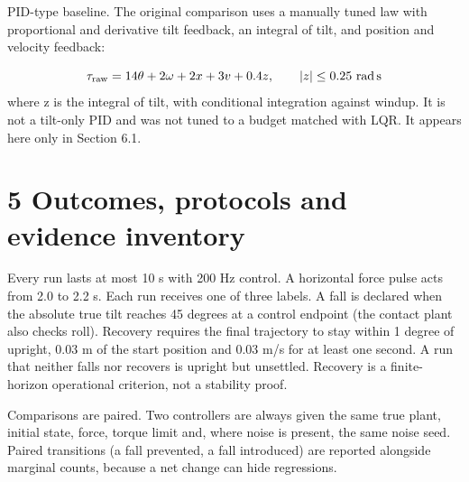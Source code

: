 \documentclass[11pt,a4paper]{article}
\begin{document}
PID-type baseline. The original comparison uses a manually tuned law with proportional and derivative tilt feedback, an integral of tilt, and position and velocity feedback:

\begin{equation}\tau_{\rm raw}=14\theta+2\omega+2x+3v+0.4z,\qquad |z|\leq 0.25\ {\rm rad\,s}\end{equation}
where z is the integral of tilt, with conditional integration against windup. It is not a tilt-only PID and was not tuned to a budget matched with LQR. It appears here only in Section 6.1.

\section*{5 Outcomes, protocols and evidence inventory}
Every run lasts at most 10 s with 200 Hz control. A horizontal force pulse acts from 2.0 to 2.2 s. Each run receives one of three labels. A fall is declared when the absolute true tilt reaches 45 degrees at a control endpoint (the contact plant also checks roll). Recovery requires the final trajectory to stay within 1 degree of upright, 0.03 m of the start position and 0.03 m/s for at least one second. A run that neither falls nor recovers is upright but unsettled. Recovery is a finite-horizon operational criterion, not a stability proof.

Comparisons are paired. Two controllers are always given the same true plant, initial state, force, torque limit and, where noise is present, the same noise seed. Paired transitions (a fall prevented, a fall introduced) are reported alongside marginal counts, because a net change can hide regressions.
\end{document}
